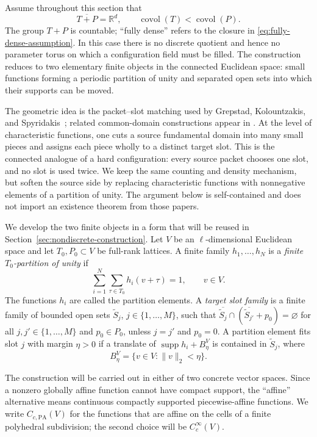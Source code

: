 \documentclass[11pt,reqno]{amsart}
\numberwithin{equation}{section}
\theoremstyle{definition}
\theoremstyle{remark}
\newcommand{\R}{\mathbb R}
\newcommand{\covol}{\operatorname{covol}}
\newcommand{\supp}{\operatorname{supp}}
\newcommand{\norm}[1]{\lVert #1\rVert}
\begin{document}
Assume throughout this section that
\begin{equation}\label{eq:fully-dense-assumption}
 \overline{T+P}=\R^d,
 \qquad
 \covol(T)<\covol(P).
\end{equation}
The group $T+P$ is countable; ``fully dense'' refers to the closure in
\eqref{eq:fully-dense-assumption}.  In this case there is no discrete
quotient and hence no parameter torus on which a configuration field must be
filled.  The construction reduces to two elementary finite objects in the
connected Euclidean space: small functions forming a periodic partition of
unity and separated open sets into which their supports can be moved.

The geometric idea is the packet--slot matching used by Grepstad,
Kolountzakis, and Spyridakis~\cite{GrepstadKolountzakisSpyridakis2025};
related common-domain constructions appear in
\cite{GrepstadKolountzakis2026}.  At the level of characteristic functions,
one cuts a source fundamental domain into many small pieces and assigns each
piece wholly to a distinct target slot.  This is the connected analogue of a
hard configuration: every source packet chooses one slot, and no slot is used
twice.  We keep the same counting and density mechanism, but soften the source
side by replacing characteristic functions with nonnegative elements of a
partition of unity.  The argument below is self-contained and does not import
an existence theorem from those papers.

We develop the two finite objects in a form that will be reused in
Section~\ref{sec:nondiscrete-construction}.  Let $V$ be an
$\ell$-dimensional Euclidean space and let $T_0,P_0\subset V$ be full-rank
lattices.  A finite family $h_1,\ldots,h_N$ is a
\emph{finite $T_0$-partition of unity} if
\[
 \sum_{i=1}^N\sum_{\tau\in T_0}h_i(v+\tau)=1,
 \qquad v\in V.
\]
The functions $h_i$ are called the partition elements.  A
\emph{target slot family} is a finite family of bounded open sets
$\widetilde S_j$, $j\in\{1,\ldots,M\}$, such that
$\overline{\widetilde S_j}\cap(\overline{\widetilde S_{j'}}+p_0)=\varnothing$
for all $j,j'\in\{1,\ldots,M\}$ and $p_0\in P_0$, unless
$j=j'$ and $p_0=0$.  A partition element fits slot $j$ with margin
$\eta>0$ if a translate of $\supp h_i+B_\eta^V$ is contained in
$\widetilde S_j$, where
\[
 B_\eta^V=\{v\in V:\norm{v}_2<\eta\}.
\]

The construction will be carried out in either of two concrete vector
spaces.  Since a nonzero globally affine function cannot have compact
support, the ``affine'' alternative means continuous compactly supported
piecewise-affine functions.  We write $C_{c,\mathrm{PA}}(V)$ for the
functions that are affine on the cells of a finite polyhedral subdivision;
the second choice will be $C_c^\infty(V)$.
\end{document}
